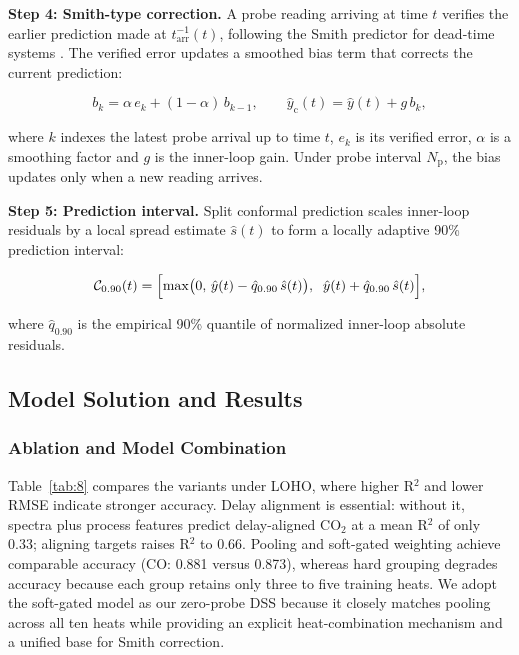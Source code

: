 \textbf{Step 4: Smith-type correction.} A probe reading arriving at time $t$ verifies the earlier prediction made at $t_{\mathrm{arr}}^{-1}(t)$, following the Smith predictor for dead-time systems \cite{ref:8}. The verified error updates a smoothed bias term that corrects the current prediction:

\begin{equation}
b_k = \alpha\,e_k + (1-\alpha)\,b_{k-1}, \qquad \hat{y}_{\mathrm{c}}(t) = \hat{y}(t) + g\,b_k, \label{eq:8}
\end{equation}

where $k$ indexes the latest probe arrival up to time $t$, $e_k$ is its verified error, $\alpha$ is a smoothing factor and $g$ is the inner-loop gain. Under probe interval $N_{\mathrm{p}}$, the bias updates only when a new reading arrives.

\textbf{Step 5: Prediction interval.} Split conformal prediction \cite{ref:9} scales inner-loop residuals by a local spread estimate $\hat{s}(t)$ to form a locally adaptive 90\% prediction interval:

\begin{equation}
\mathcal{C}_{0.90}(t) = \Bigl[\max\bigl(0,\,\hat{y}(t) - \hat{q}_{0.90}\,\hat{s}(t)\bigr),\;\; \hat{y}(t) + \hat{q}_{0.90}\,\hat{s}(t)\Bigr], \label{eq:conformal}
\end{equation}

where $\hat{q}_{0.90}$ is the empirical 90\% quantile of normalized inner-loop absolute residuals.

\subsection{Model Solution and Results}\label{sec:7.3}

\subsubsection{Ablation and Model Combination}\label{sec:7.3.1}

Table~\ref{tab:8} compares the variants under LOHO, where higher R\ensuremath{^{2}} and lower RMSE indicate stronger accuracy. Delay alignment is essential: without it, spectra plus process features predict delay-aligned CO\ensuremath{_{2}} at a mean R\ensuremath{^{2}} of only 0.33; aligning targets raises R\ensuremath{^{2}} to 0.66. Pooling and soft-gated weighting achieve comparable accuracy (CO: 0.881 versus 0.873), whereas hard grouping degrades accuracy because each group retains only three to five training heats. We adopt the soft-gated model as our zero-probe DSS because it closely matches pooling across all ten heats while providing an explicit heat-combination mechanism and a unified base for Smith correction.

